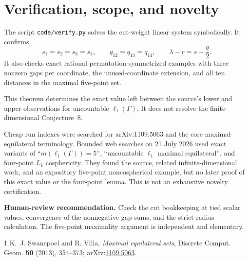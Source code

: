 \documentclass[11pt]{article}
\newcommand{\ellone}{\ell_1}
\begin{document}
\section{Verification, scope, and novelty}

The script \texttt{code/verify.py} solves the cut-weight linear system symbolically. It confirms
\[
 s_1=s_2=s_3=s_4,\qquad q_{12}=q_{13}=q_{14},\qquad
 \lambda-r=s+\frac q2.
\]
It also checks exact rational permutation-symmetrized examples with three nonzero gaps per coordinate, the unused-coordinate extension, and all ten distances in the maximal five-point set.

This theorem determines the exact value left between the source's lower and upper observations for uncountable $\ellone(\Gamma)$. It does not resolve the finite-dimensional Conjecture~8.

Cheap run indexes were searched for arXiv:1109.5063 and the core maximal-equilateral terminology. Bounded web searches on 21 July 2026 used exact variants of ``$m(\ell_1(\Gamma))=5$'', ``uncountable $\ell_1$ maximal equilateral'', and four-point $L_1$ cosphericity. They found the source, related infinite-dimensional work, and an expository five-point noncospherical example, but no later proof of this exact value or the four-point lemma. This is not an exhaustive novelty certification.

\medskip
\noindent\textbf{Human-review recommendation.} Check the cut bookkeeping at tied scalar values, convergence of the nonnegative gap sums, and the strict radius calculation. The five-point maximality argument is independent and elementary.

\begin{thebibliography}{1}
K.~J. Swanepoel and R. Villa,
\emph{Maximal equilateral sets},
Discrete Comput. Geom. \textbf{50} (2013), 354--373;
arXiv:\href{https://arxiv.org/abs/1109.5063}{1109.5063}.
\end{thebibliography}
\end{document}

